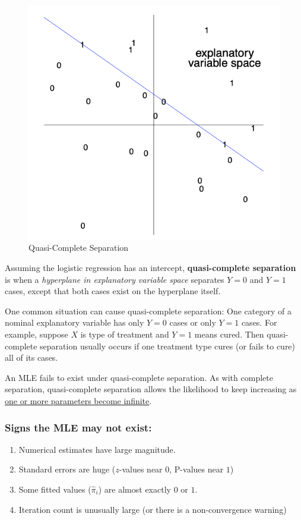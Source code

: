 \documentclass[11pt]{elegantbook}
\begin{document}
\begin{center}\begin{figure}[htbp]
    \centering
    \includegraphics[scale=0.3]{quasi-complete separation.png}
    \caption{Quasi-Complete Separation}
    \label{}
\end{figure}\end{center}
\begin{definition}
\normalfont
Assuming the logistic regression has an intercept, \textbf{quasi-complete separation} is when a \textit{hyperplane in explanatory variable space} separates $Y = 0$ and $Y = 1$ cases, except that both cases exist on the hyperplane itself.
\end{definition}
\begin{example}
    One common situation can cause quasi-complete separation: One category of a nominal explanatory variable has only $Y =0$ cases or only $Y =1$ cases. For example, suppose $X$ is type of treatment and $Y = 1$ means cured. Then quasi-complete separation usually occurs if one treatment type cures (or fails to cure) all of its cases.
\end{example}
An MLE fails to exist under quasi-complete separation. As with complete separation, quasi-complete separation allows the likelihood to keep increasing as \underline{one or more parameters become infinite}.

\subsubsection*{Signs the MLE may not exist:}
\begin{enumerate}[1.]
    \item Numerical estimates have large magnitude.
    \item Standard errors are huge ($z$-values near $0$, P-values near $1$)
    \item Some fitted values ($\hat{\pi}_i$) are almost exactly $0$ or $1$.
    \item Iteration count is unusually large (or there is a non-convergence warning)
\end{enumerate}
\end{document}

